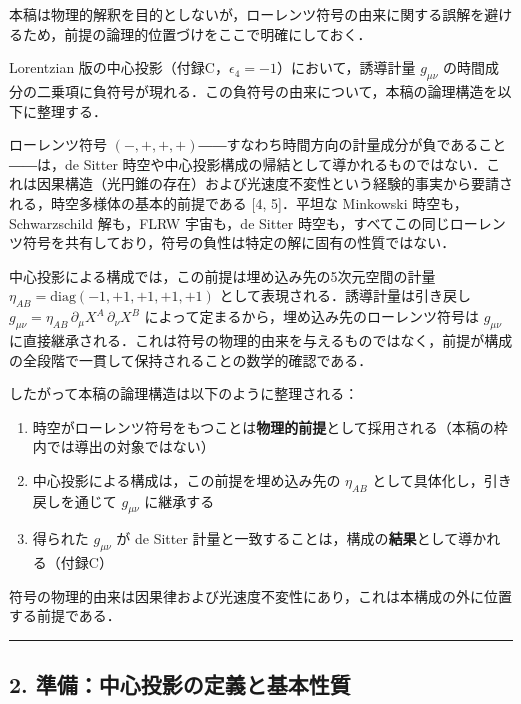 \documentclass[a4paper,11pt]{ltjsarticle}
\theoremstyle{definition}
\providecommand{\tightlist}{\setlength{\itemsep}{0pt}\setlength{\parskip}{0pt}}
\begin{document}
本稿は物理的解釈を目的としないが，ローレンツ符号の由来に関する誤解を避けるため，前提の論理的位置づけをここで明確にしておく．

Lorentzian 版の中心投影（付録C，\(\epsilon_4 = -1\)）において，誘導計量 \(g_{\mu\nu}\) の時間成分の二乗項に負符号が現れる．この負符号の由来について，本稿の論理構造を以下に整理する．

ローレンツ符号 \((-,+,+,+)\)――すなわち時間方向の計量成分が負であること――は，de Sitter 時空や中心投影構成の帰結として導かれるものではない．これは因果構造（光円錐の存在）および光速度不変性という経験的事実から要請される，時空多様体の基本的前提である {[}4, 5{]}．平坦な Minkowski 時空も，Schwarzschild 解も，FLRW 宇宙も，de Sitter 時空も，すべてこの同じローレンツ符号を共有しており，符号の負性は特定の解に固有の性質ではない．

中心投影による構成では，この前提は埋め込み先の5次元空間の計量 \(\eta_{AB} = \mathrm{diag}(-1,+1,+1,+1,+1)\) として表現される．誘導計量は引き戻し \(g_{\mu\nu} = \eta_{AB}\,\partial_\mu X^A\,\partial_\nu X^B\) によって定まるから，埋め込み先のローレンツ符号は \(g_{\mu\nu}\) に直接継承される．これは符号の物理的由来を与えるものではなく，前提が構成の全段階で一貫して保持されることの数学的確認である．

したがって本稿の論理構造は以下のように整理される：

\begin{enumerate}
\def\labelenumi{\arabic{enumi}.}
\tightlist
\item
  時空がローレンツ符号をもつことは\textbf{物理的前提}として採用される（本稿の枠内では導出の対象ではない）
\item
  中心投影による構成は，この前提を埋め込み先の \(\eta_{AB}\) として具体化し，引き戻しを通じて \(g_{\mu\nu}\) に継承する
\item
  得られた \(g_{\mu\nu}\) が de Sitter 計量と一致することは，構成の\textbf{結果}として導かれる（付録C）
\end{enumerate}

符号の物理的由来は因果律および光速度不変性にあり，これは本構成の外に位置する前提である．

\begin{center}\rule{0.5\linewidth}{0.5pt}\end{center}

\subsection{2. 準備：中心投影の定義と基本性質}\label{ux6e96ux5099ux4e2dux5fc3ux6295ux5f71ux306eux5b9aux7fa9ux3068ux57faux672cux6027ux8cea}
\end{document}
